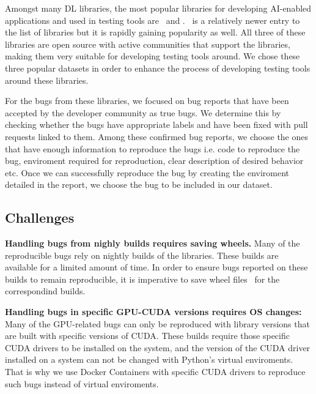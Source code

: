 \documentclass[sigconf,screen]{acmart}
\begin{document}
Amongst many DL libraries, the most popular libraries for developing AI-enabled applications and used in testing tools are \torch~and \tf. \jax~is a relatively newer entry to the list of libraries but it is rapidly gaining popularity as well. All three of these libraries are open source with active communities that support the libraries, making them very suitable for developing testing tools around. We chose these three popular datasets in order to enhance the process of developing testing tools around these libraries.


For the bugs from these libraries, we focused on bug reports that have been accepted by the developer community as true bugs. We determine this by checking whether the bugs have appropriate labels and have been fixed with pull requests linked to them. Among these confirmed bug reports, we choose the ones that have enough information to reproduce the bugs i.e. code to reproduce the bug, enviroment required for reproduction, clear description of desired behavior etc. Once we can successfully reproduce the bug by creating the enviroment detailed in the report, we choose the bug to be included in our dataset.


\subsection{Challenges}
\label{sec:challenges}

\textbf{Handling bugs from nighly builds requires saving wheels.}  Many
of the reproducible bugs rely on nightly builds of the
libraries. These builds are available for a limited amount of time. In
order to ensure bugs reported on these builds to remain reproducible,
it is imperative to save wheel files~\cite{wheels} for the
correspondind builds.

\textbf{Handling bugs in specific GPU-CUDA versions requires OS
  changes:} Many of the GPU-related bugs can only be reproduced with
library versions that are built with specific versions of CUDA.
These builds require those specific CUDA drivers to be installed on
the system, and the version of the CUDA driver installed on a system
can not be changed with Python's virtual enviroments.
That is why we use Docker Containers with specific CUDA drivers to reproduce
such bugs instead of virtual enviroments.
\end{document}
